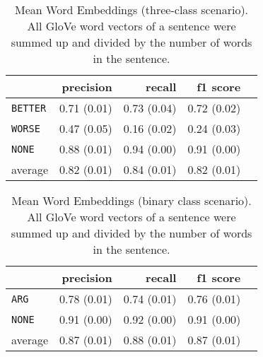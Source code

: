 	
	\begin{table}[h] 
		\centering 
		\caption{Mean Word Embeddings (three-class scenario). All GloVe word vectors of a sentence were summed up and divided by the number of words in the sentence.} 
		\label{  }
		\begin{tabular}{@{}lrrrr@{}}
			\toprule
			        & precision                & recall                   & f1 score                 \\ \midrule 
			\texttt{BETTER}  & 0.71 \scriptsize{(0.01)} & 0.73 \scriptsize{(0.04)} & 0.72 \scriptsize{(0.02)} \\ 
			\texttt{WORSE}   & 0.47 \scriptsize{(0.05)} & 0.16 \scriptsize{(0.02)} & 0.24 \scriptsize{(0.03)} \\ 
			\texttt{NONE}    & 0.88 \scriptsize{(0.01)} & 0.94 \scriptsize{(0.00)} & 0.91 \scriptsize{(0.00)} \\ 
			average & 0.82 \scriptsize{(0.01)} & 0.84 \scriptsize{(0.01)} & 0.82 \scriptsize{(0.01)} \\ 
			\bottomrule
		\end{tabular}
	\end{table}
	
	\begin{table}[h] 
		\centering 
		\caption{Mean Word Embeddings (binary class scenario). All GloVe word vectors of a sentence were summed up and divided by the number of words in the sentence.} 
		\label{  }
		\begin{tabular}{@{}lrrrr@{}}
			\toprule
			        & precision                & recall                   & f1 score                 \\ \midrule 
			\texttt{ARG}     & 0.78 \scriptsize{(0.01)} & 0.74 \scriptsize{(0.01)} & 0.76 \scriptsize{(0.01)} \\ 
			\texttt{NONE}    & 0.91 \scriptsize{(0.00)} & 0.92 \scriptsize{(0.00)} & 0.91 \scriptsize{(0.00)} \\ 
			average & 0.87 \scriptsize{(0.01)} & 0.88 \scriptsize{(0.01)} & 0.87 \scriptsize{(0.01)} \\ 
			\bottomrule
		\end{tabular}
	\end{table}
	

